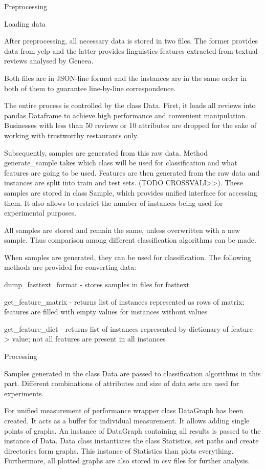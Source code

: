 Preprocessing

Loading data

After preprocessing, all necessary data is stored in two files. The former provides data from yelp and the latter provides linguistics features extracted from textual reviews analysed by Geneea.

Both files are in JSON-line format and the instances are in the same order in both of them to guarantee line-by-line correspondence.

The entire process is controlled by the class Data. First, it loads all reviews into pandas Dataframe to achieve high performance and convenient manipulation. Businesses with less than 50 reviews or 10 attributes are dropped for the sake of working with trustworthy restaurants only.

Subsequently, samples are generated from this raw data. Method generate\_sample takes which class will be used for classification and what features are going to be used. Features are then generated from the raw data and instances are split into train and test sets. (TODO CROSSVALI>>). These samples are stored in class Sample, which provides unified interface for accessing them. It also allows to restrict the number of instances being used for experimental purposes.

All samples are stored and remain the same, unless overwritten with a new sample. Thus comparison among different classification algorithms can be made.

When samples are generated, they can be used for classification. The following methods are provided for converting data:

dump\_fasttext\_format - stores samples in files for fasttext

get\_feature\_matrix - returns list of instances represented as rows of matrix; features are filled with empty values for instances without values

get\_feature\_dict - returns list of instances represented by dictionary of feature -> value; not all features are present in all instances


Processing

Samples generated in the class Data are passed to classification algorithms in this part. Different combinations of attributes and size of data sets are used for experiments.

For unified measurement of performance wrapper class DataGraph has been created. It acts as a buffer for individual measurement. It allows adding single points of graphs. An instance of DataGraph containing all results is passed to the instance of Data. Data class instantiates the class Statistics, set paths and create directories form graphs. This instance of Statistics than plots everything. Furthermore, all plotted graphs are also stored in csv files for further analysis.
